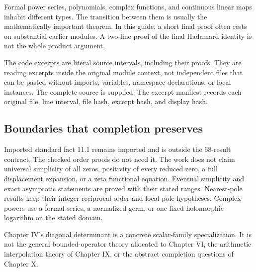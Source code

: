 Formal power series, polynomials, complex functions, and continuous linear maps inhabit different types. The transition between them is usually the mathematically important theorem. In this guide, a short final proof often rests on substantial earlier modules. A two-line proof of the final Hadamard identity is not the whole product argument.

The code excerpts are literal source intervals, including their proofs. They are reading excerpts inside the original module context, not independent files that can be pasted without imports, variables, namespace declarations, or local instances. The complete source is supplied. The excerpt manifest records each original file, line interval, file hash, excerpt hash, and display hash.

\subsection{Boundaries that completion preserves}
Imported standard fact 11.1 remains imported and is outside the 68-result contract. The checked order proofs do not need it. The work does not claim universal simplicity of all zeros, positivity of every reduced zero, a full displacement expansion, or a zeta functional equation. Eventual simplicity and exact asymptotic statements are proved with their stated ranges. Nearest-pole results keep their integer reciprocal-order and local pole hypotheses. Complex powers use a formal series, a normalized germ, or one fixed holomorphic logarithm on the stated domain.

Chapter IV's diagonal determinant is a concrete scalar-family specialization. It is not the general bounded-operator theory allocated to Chapter VI, the arithmetic interpolation theory of Chapter IX, or the abstract completion questions of Chapter X.
